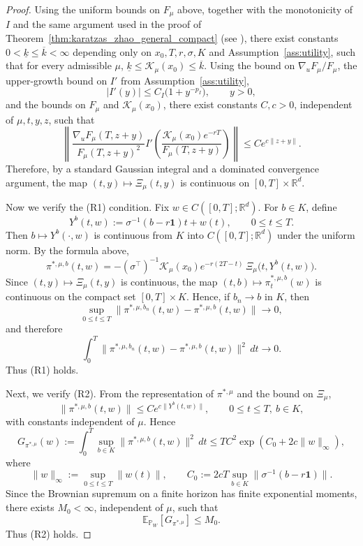 \documentclass[11pt]{article}
\theoremstyle{definition}
\begin{document}
\begin{proof}
{Using the uniform bounds on $F_\mu$ above, together with the monotonicity of $I$ and the same
argument used in the proof of Theorem~\ref{thm:karatzas_zhao_general_compact} (see \cite{KZ98}), there exist constants
$0<\underline{k}\le \overline{k}<\infty$
depending only on $x_0,T,r,\sigma,K$ and Assumption~\ref{ass:utility}, such that for every admissible $\mu$, $\underline{k}\le \mathcal{K}_\mu(x_0)\le \overline{k}$.
Using the bound on $\nabla_u F_\mu/F_\mu$, the upper-growth bound on $I'$ from
Assumption~\ref{ass:utility},
\[
|I'(y)|\le C_I\bigl(1+y^{-p_I}\bigr),
\qquad y>0,
\]
and the bounds on $F_\mu$ and $\mathcal{K}_\mu(x_0)$, there exist constants $C,c>0$, independent of
$\mu,t,y,z$, such that
\[
\left\|
\frac{\nabla_u F_\mu(T,z+y)}{F_\mu(T,z+y)^2}
I'\!\left(\frac{\mathcal{K}_\mu(x_0)e^{-rT}}{F_\mu(T,z+y)}\right)
\right\|
\le
C e^{c\|z+y\|}.
\]
Therefore, 
by a standard Gaussian integral and a dominated convergence argument, 
the map $(t,y)\mapsto \Xi_\mu(t,y)$ is continuous on $[0,T]\times\mathbb{R}^d$.}


{
Now we verify the (R1) condition.
Fix $w\in C([0,T];\mathbb{R}^d)$. For $b\in K$, define
\[
Y^b(t,w):=\sigma^{-1}(b-r\mathbf{1})t+w(t),\qquad 0\le t\le T.
\]
Then $b\longmapsto Y^b(\cdot,w)$
is continuous from $K$ into $C([0,T];\mathbb{R}^d)$ under the uniform norm. By the formula above,
\[
\pi^{*,\mu,b}(t,w)
=
-(\sigma^\top)^{-1}\mathcal{K}_\mu(x_0)e^{-r(2T-t)}\,
\Xi_\mu\!\bigl(t,Y^b(t,w)\bigr).
\]
Since $(t,y)\mapsto \Xi_\mu(t,y)$ is continuous, the map $(t,b)\longmapsto \pi_t^{*,\mu,b}(w)$
is continuous on the compact set $[0,T]\times K$. Hence, if $b_n\to b$ in $K$, then
\[
\sup_{0\le t\le T}
\bigl\|\pi^{*,\mu,b_n}(t,w)-\pi^{*,\mu,b}(t,w)\bigr\|
\to 0,
\]
and therefore
\[
\int_0^T
\bigl\|\pi^{*,\mu,b_n}(t,w)-\pi^{*,\mu,b}(t,w)\bigr\|^2\,dt
\to 0.
\]
Thus (R1) holds.}

{Next, we verify (R2). From the representation of $\pi^{*,\mu}$ and the bound on $\Xi_\mu$,
\[
\|\pi^{*,\mu,b}(t,w)\|
\le
C e^{c\|Y^b(t,w)\|},
\qquad 0\le t\le T,\ b\in K,
\]
with constants independent of $\mu$. Hence
\[
G_{\pi^{*,\mu}}(w)
:=
\int_0^T \sup_{b\in K}\|\pi^{*,\mu,b}(t,w)\|^2\,dt
\le
T C^2
\exp\!\left(
C_0+2c\|w\|_\infty
\right),
\]
where
\[
\|w\|_\infty:=\sup_{0\le t\le T}\|w(t)\|,
\qquad
C_0:=2cT\sup_{b\in K}\|\sigma^{-1}(b-r\mathbf{1})\|.
\]
Since the Brownian supremum on a finite horizon has finite exponential moments, there exists
$M_0<\infty$, independent of $\mu$, such that
\[
\mathbb{E}_{\mathbb{P}_W}\!\left[G_{\pi^{*,\mu}}\right]\le M_0.
\]
Thus (R2) holds.}


\end{proof}
\end{document}
